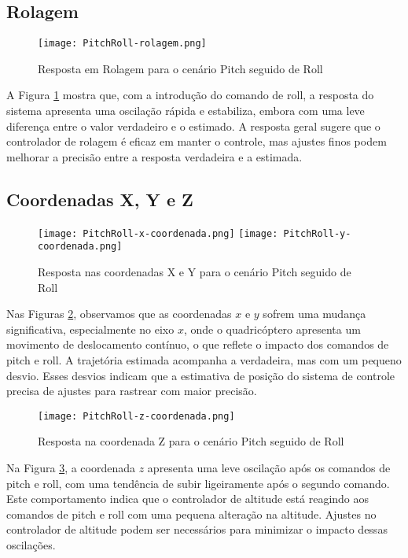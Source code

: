 \subsection{Rolagem}

\begin{figure}[H]
    \centering
    \texttt{[image: PitchRoll-rolagem.png]}
    \caption{Resposta em Rolagem para o cenário Pitch seguido de Roll}
    \label{fig:pitchroll-rolagem}
\end{figure}

A Figura \ref{fig:pitchroll-rolagem} mostra que, com a introdução do comando de roll, a resposta do sistema apresenta uma oscilação rápida e estabiliza, embora com uma leve diferença entre o valor verdadeiro e o estimado. A resposta geral sugere que o controlador de rolagem é eficaz em manter o controle, mas ajustes finos podem melhorar a precisão entre a resposta verdadeira e a estimada.

\subsection{Coordenadas X, Y e Z}

\begin{figure}[H]
    \centering
    \texttt{[image: PitchRoll-x-coordenada.png]}
    \texttt{[image: PitchRoll-y-coordenada.png]}
    \caption{Resposta nas coordenadas X e Y para o cenário Pitch seguido de Roll}
    \label{fig:pitchroll-xy-coordenadas}
\end{figure}

Nas Figuras \ref{fig:pitchroll-xy-coordenadas}, observamos que as coordenadas \(x\) e \(y\) sofrem uma mudança significativa, especialmente no eixo \(x\), onde o quadricóptero apresenta um movimento de deslocamento contínuo, o que reflete o impacto dos comandos de pitch e roll. A trajetória estimada acompanha a verdadeira, mas com um pequeno desvio. Esses desvios indicam que a estimativa de posição do sistema de controle precisa de ajustes para rastrear com maior precisão.

\begin{figure}[H]
    \centering
    \texttt{[image: PitchRoll-z-coordenada.png]}
    \caption{Resposta na coordenada Z para o cenário Pitch seguido de Roll}
    \label{fig:pitchroll-z-coordenada}
\end{figure}

Na Figura \ref{fig:pitchroll-z-coordenada}, a coordenada \(z\) apresenta uma leve oscilação após os comandos de pitch e roll, com uma tendência de subir ligeiramente após o segundo comando. Este comportamento indica que o controlador de altitude está reagindo aos comandos de pitch e roll com uma pequena alteração na altitude. Ajustes no controlador de altitude podem ser necessários para minimizar o impacto dessas oscilações.


